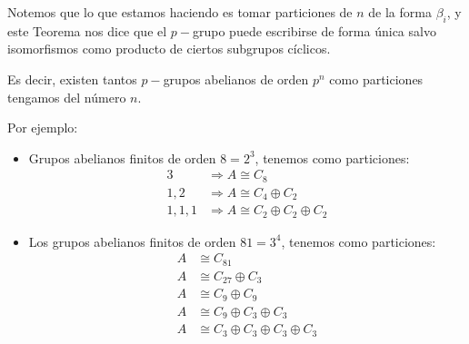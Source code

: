 \begin{observacion}
    Notemos que lo que estamos haciendo es tomar particiones de $n$ de la forma $\beta_i$, y este Teorema nos dice que el $p-$grupo puede escribirse de forma única salvo isomorfismos como producto de ciertos subgrupos cíclicos.\newline

    Es decir, existen tantos $p-$grupos abelianos de orden $p^n$ como particiones tengamos del número $n$.
\end{observacion}

\begin{ejemplo}
    Por ejemplo:
    \begin{itemize}
        \item Grupos abelianos finitos de orden $8 = 2^3$, tenemos como particiones:
            \begin{align*}
                3& \Longrightarrow A\cong C_8 \\
                1, 2& \Longrightarrow A\cong C_4\oplus C_2 \\
                1, 1, 1& \Longrightarrow A\cong C_2 \oplus C_2 \oplus C_2
            \end{align*}
        \item Los grupos abelianos finitos de orden $81 = 3^4$, tenemos como particiones:
            \begin{align*}
                A &\cong C_{81} \\
                A &\cong C_{27} \oplus C_3 \\
                A &\cong C_9 \oplus C_9 \\
                A &\cong C_9 \oplus C_3 \oplus C_3 \\
                A &\cong C_3 \oplus C_3 \oplus C_3 \oplus C_3 
            \end{align*}
    \end{itemize}
\end{ejemplo}

